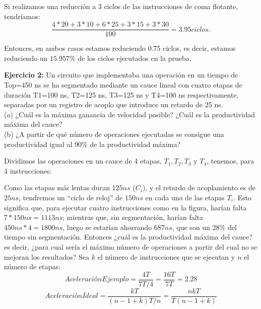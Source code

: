 \documentclass[a4paper, 11pt]{article}
\begin{document}
Si realizamos una reducción a 3 ciclos de las instrucciones de coma flotante, tendríamos:  $$\frac{4*20+3*10+6*25+3*15+3*30}{100} = 3.95 ciclos.$$

Entonces, en ambos casos estamos reduciendo 0.75 ciclos, es decir, estamos reduciendo un $15.957\%$ de los ciclos ejecutados en la prueba. 

\textbf{\large{\textcolor{BurntOrange}{Ejercicio 2:}}}
\textsf{
Un circuito que implementaba una operación en un tiempo de Top=450 ns se ha segmentado
mediante un cauce lineal con cuatro etapas de duración T1=100 ns, T2=125 ns, T3=125 ns y T4=100 ns
respectivamente, separadas por un registro de acoplo que introduce un retardo de 25 ns. 
\\(a) ¿Cuál es la máxima ganancia de velocidad posible? ¿Cuál es la productividad máxima del cauce? 
\\(b) ¿A partir de qué número de operaciones ejecutadas se consigue una productividad igual al 90\% de la productividad máxima?}

Dividimos las operaciones en un cauce de 4 etapas, $T_1,T_2,T_3$ y $T_4$, tenemos, para 4 instrucciones:

\begin{center}
\end{center}

  Como las etapas más lentas duran $125ns$ ($C_i$), y el retardo de acoplamiento es de $25ns$, tendremos un ``ciclo de reloj'' de $150ns$ en cada una de las etapas $T_i$. Esto significa que, para ejecutar cuatro instrucciones como en la figura, harían falta $7*150ns=1113ns$; mientras que, sin segmentación, harían falta $450ns*4=1800ns$, luego se estarían ahorrando $687ns$, que son un $28\%$ del tiempo sin segmentación. 
  Entonces ¿cuál es la productividad máxima del cauce? es decir, ¿para cual sería el máximo número de operaciones a partir del cual no se mejoran los resultados? Sea $k$ el número de instrucciones que se ejecutan y $n$ el número de etapas: 
  $$AceleraciónEjemplo = \frac{4T}{7T/4} = \frac{16T}{7T} = 2.28$$ 
  $$AceleraciónIdeal = \frac{kT}{(n-1+k)T/n}= \frac{nkT}{T(n-1+k)} $$
  
\end{document}
